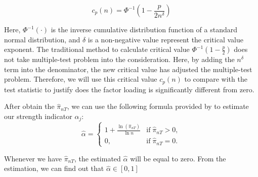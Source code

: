 \documentclass[12pt]{article}
\begin{document}
\[   c_p(n) = \Phi^{-1}(1 - \frac{p}{2n^\delta})   \tag{4} \label{critical_value_function} \]

Here, $\Phi^{-1}(\cdot)$ is the inverse cumulative distribution function of a standard normal distribution, and $\delta$ is a non-negative value represent the critical value exponent. 
The traditional method to calculate critical value $\Phi^{-1}(1 - \frac{p}{2}) $ does not take multiple-test problem into the consideration.
Here, by adding the $n^\delta$ term into the denominator, the new critical value has adjusted the multiple-test problem. 
Therefore, we will use this critical value $c_p(n)$ to compare with the test statistic to justify does the factor loading is significantly different from zero.

After obtain the $\hat{\pi}_{nT}$, we can use the following formula provided by  to estimate our strength indicator $\alpha_j$:
\[ \hat{\alpha} = \begin{cases}
1+\frac{\ln(\hat{\pi}_{nT})}{\ln n} & \text{if}\; \hat{\pi}_{nT} > 0,\\
0, & \text{if}\; \hat{\pi}_{nT} = 0.
\end{cases} \]

Whenever we have $\hat{\pi}_{nT}$, the estimated $\hat{\alpha}$ will be equal to zero. 
From the estimation, we can find out that $\hat{\alpha} \in [0,1]$


\end{document}
